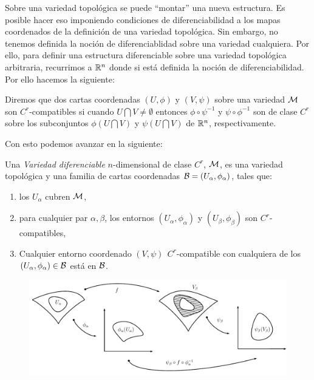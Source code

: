 {}
\label{s:WL:VariedadDiferenciable}

Sobre una  variedad topol\'ogica  se puede ``montar''  una nueva  estructura. Es
posible  hacer  eso imponiendo  condiciones  de  diferenciabilidad  a los  mapas
coordenados de  la definici\'on  de una variedad  topol\'ogica. Sin  embargo, no
tenemos   definida  la   noci\'on   de  diferenciablidad   sobre  una   variedad
cualquiera.  Por  ello, para  definir  una  estructura  diferenciable sobre  una
variedad  topol\'ogica  arbitraria,  recurrimos  a  $\mathbb{R}^n$  donde  si  est\'a
definida la noci\'on de diferenciabilidad. Por ello hacemos la siguiente:
%
\begin{definicion}[$C^r$-compatibilidad]
  Diremos que dos cartas coordenadas  $(U,\phi)$ y $(V,\psi)$ sobre una variedad
  $\mathcal{M}$ son  $C^r$-compatibles si  cuando $U \bigcap  V \ne \emptyset  $ entonces
  $\phi \circ \psi^{-1}$  y $\psi \circ \phi^{-1}$ son de  clase $C^r$ sobre los
  subconjuntos  $\phi(U  \bigcap  V)$   y  $\psi(U  \bigcap  V)$  de  $\mathbb{R}^n$,
  respectivamente.
\end{definicion}
%
Con esto podemos avanzar en la siguiente:
%
\begin{definicion}
  Una {\it Variedad diferenciable} $n$-dimensional  de clase $C^r$, $\mathcal{M}$, es una
  variedad  topol\'ogica  y una  familia  de  cartas  coordenadas $\mathcal{B}  =  \left(
    U_\alpha , \phi_\alpha \right)$, tales que:
  \begin{enumerate}
  \item los $U_{\alpha}$ cubren $\mathcal{M}$,
  \item  para cualquier  par $\alpha,  \beta$, los  entornos $\left(  U_\alpha ,
      \phi_\alpha \right)$  y $\left( U_\beta  , \phi_\beta \right)$  son $C^r$-
    compatibles,
  \item  Cualquier   entorno  coordenado  $(V,\psi)   \:\:  C^r$-compatible  con
    cualquiera de los  $\left( U_\alpha , \phi_\alpha \right)  \in \mathcal{B}$ est\'a en
    $\mathcal{B}$.
  \end{enumerate}
\end{definicion}

\begin{figure}
 \centerline{\includegraphics[width=13cm]{figura2.pdf}}
%
\end{figure}

